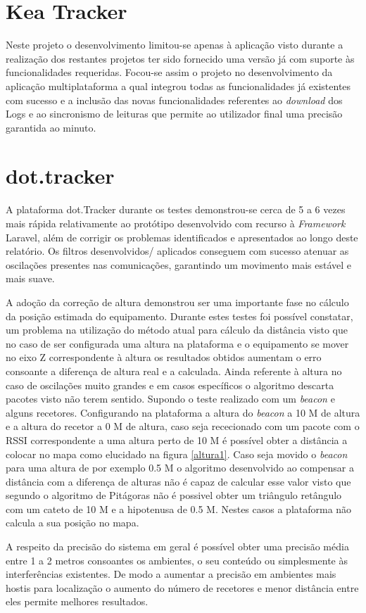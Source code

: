 \section{Kea Tracker}

\par Neste projeto o desenvolvimento limitou-se apenas à aplicação visto durante a realização dos restantes projetos ter sido fornecido uma versão já com suporte às funcionalidades requeridas. Focou-se assim o projeto no desenvolvimento da aplicação multiplataforma a qual integrou todas as funcionalidades já existentes com sucesso e a inclusão das novas funcionalidades  referentes ao \textit{download} dos Logs e ao sincronismo de leituras que permite ao utilizador final uma precisão garantida ao minuto.

\section{dot.tracker}

\par A plataforma dot.Tracker durante os testes demonstrou-se cerca de 5 a 6 vezes mais rápida relativamente ao protótipo desenvolvido com recurso à \textit{Framework} Laravel, além de corrigir os problemas identificados e apresentados ao longo deste relatório. Os filtros desenvolvidos/ aplicados conseguem com sucesso atenuar as oscilações presentes nas comunicações, garantindo um movimento mais estável e mais suave. 
\par  A adoção da correção de altura demonstrou ser uma importante fase no cálculo da posição estimada do equipamento. Durante estes testes foi possível constatar, um problema na utilização do método atual para cálculo da distância visto que no caso de ser configurada uma altura na plataforma e o equipamento se mover no eixo Z correspondente à altura os resultados obtidos aumentam o erro consoante a diferença de altura real e a calculada.  Ainda referente à altura no caso de oscilações muito grandes  e em casos específicos o algoritmo descarta pacotes visto não terem sentido. Supondo o teste realizado com um \textit{beacon} e alguns recetores. Configurando na plataforma a altura do \textit{beacon} a 10 M de altura e a altura do recetor a 0 M de altura, caso seja rececionado com um pacote com o RSSI correspondente a uma altura  perto de 10 M é possível  obter a distância a colocar no mapa como elucidado na figura \ref{altura1}. Caso seja movido o \textit{beacon} para uma altura de por exemplo 0.5 M o algoritmo desenvolvido ao compensar a distância com a diferença de alturas não é capaz de calcular esse valor visto que segundo o algoritmo de Pitágoras não é possivel obter um triângulo retângulo com um cateto de 10 M e a hipotenusa de 0.5 M. Nestes casos a plataforma não calcula  a sua posição no mapa.
\par A respeito da precisão do sistema em geral é possível obter uma precisão média entre 1 a 2 metros  consoantes os ambientes, o seu conteúdo ou simplesmente às interferências existentes. De modo a aumentar a  precisão em ambientes mais hostis para localização o aumento do número de recetores e menor distância entre eles permite melhores resultados.